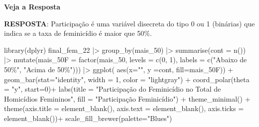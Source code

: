 \documentclass[
  letterpaper,
  DIV=11,
  numbers=noendperiod]{scrreprt}
\newenvironment{Shaded}{\begin{snugshade}}{\end{snugshade}}
\newcommand{\AttributeTok}[1]{\textcolor[rgb]{0.40,0.45,0.13}{#1}}
\newcommand{\DecValTok}[1]{\textcolor[rgb]{0.68,0.00,0.00}{#1}}
\newcommand{\FunctionTok}[1]{\textcolor[rgb]{0.28,0.35,0.67}{#1}}
\newcommand{\NormalTok}[1]{\textcolor[rgb]{0.00,0.23,0.31}{#1}}
\newcommand{\SpecialCharTok}[1]{\textcolor[rgb]{0.37,0.37,0.37}{#1}}
\newcommand{\StringTok}[1]{\textcolor[rgb]{0.13,0.47,0.30}{#1}}
\begin{document}
\begin{tcolorbox}[enhanced jigsaw, bottomrule=.15mm, leftrule=.75mm, arc=.35mm, colframe=quarto-callout-warning-color-frame, breakable, opacityback=0, toprule=.15mm, colback=white, left=2mm, rightrule=.15mm]
\begin{minipage}[t]{5.5mm}
\textcolor{quarto-callout-warning-color}{\faExclamationTriangle}
\end{minipage}%
\begin{minipage}[t]{\textwidth - 5.5mm}

\vspace{-3mm}\textbf{Veja a Resposta}\vspace{3mm}

\textbf{RESPOSTA}: Participação é uma variável disecreta do tipo 0 ou 1
(binárias) que indica se a taxa de feminicídio é maior que 50\%.

\begin{Shaded}
\begin{Highlighting}[]
\FunctionTok{library}\NormalTok{(dplyr)}
\NormalTok{final\_fem\_22 }\SpecialCharTok{|\textgreater{}} 
  \FunctionTok{group\_by}\NormalTok{(mais\_50) }\SpecialCharTok{|\textgreater{}}
  \FunctionTok{summarise}\NormalTok{(}\AttributeTok{cont =} \FunctionTok{n}\NormalTok{()) }\SpecialCharTok{|\textgreater{}} 
  \FunctionTok{mutate}\NormalTok{(}\AttributeTok{mais\_50F =} \FunctionTok{factor}\NormalTok{(mais\_50, }\AttributeTok{levels =} \FunctionTok{c}\NormalTok{(}\DecValTok{0}\NormalTok{, }\DecValTok{1}\NormalTok{), }\AttributeTok{labels =} \FunctionTok{c}\NormalTok{(}\StringTok{"Abaixo de 50\%"}\NormalTok{, }\StringTok{"Acima de 50\%"}\NormalTok{))) }\SpecialCharTok{|\textgreater{}} 
  \FunctionTok{ggplot}\NormalTok{( }\FunctionTok{aes}\NormalTok{(}\AttributeTok{x=}\StringTok{""}\NormalTok{, }\AttributeTok{y =}\NormalTok{cont, }\AttributeTok{fill=}\NormalTok{mais\_50F)) }\SpecialCharTok{+}
  \FunctionTok{geom\_bar}\NormalTok{(}\AttributeTok{stat=}\StringTok{"identity"}\NormalTok{, }\AttributeTok{width =} \DecValTok{1}\NormalTok{, }\AttributeTok{color =} \StringTok{"lightgray"}\NormalTok{) }\SpecialCharTok{+}
  \FunctionTok{coord\_polar}\NormalTok{(}\AttributeTok{theta =} \StringTok{"y"}\NormalTok{, }\AttributeTok{start=}\DecValTok{0}\NormalTok{)}\SpecialCharTok{+}
  \FunctionTok{labs}\NormalTok{(}\AttributeTok{title =} \StringTok{"Participação do Feminicídio no Total de Homicídios Femininos"}\NormalTok{, }\AttributeTok{fill =} \StringTok{"Participação Feminicídio"}\NormalTok{) }\SpecialCharTok{+}
  \FunctionTok{theme\_minimal}\NormalTok{() }\SpecialCharTok{+}
  \FunctionTok{theme}\NormalTok{(}\AttributeTok{axis.title =} \FunctionTok{element\_blank}\NormalTok{(),}
        \AttributeTok{axis.text =} \FunctionTok{element\_blank}\NormalTok{(),}
        \AttributeTok{axis.ticks =} \FunctionTok{element\_blank}\NormalTok{())}\SpecialCharTok{+}
  \FunctionTok{scale\_fill\_brewer}\NormalTok{(}\AttributeTok{palette=}\StringTok{"Blues"}\NormalTok{)}
\end{Highlighting}
\end{Shaded}


\end{minipage}
\end{tcolorbox}
\end{document}
